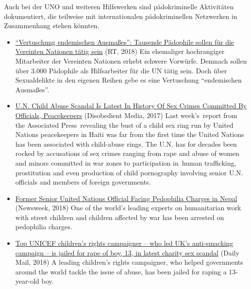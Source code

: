 Auch bei der UNO und weiteren Hilfswerken sind pädokriminelle
Aktivitäten dokumentiert, die teilweise mit internationalen
pädokriminellen Netzwerken in Zusammenhang stehen könnten.

\begin{itemize}
\tightlist
\item
  \href{https://deutsch.rt.com/gesellschaft/65344-vertuschung-endemischen-ausmasses-tausende-paedophile-vereinte-nationen/}{``Vertuschung
  endemischen Ausmaßes'': Tausende Pädophile sollen für die Vereinten
  Nationen tätig sein} (RT, 2018) Ein ehemaliger hochrangiger
  Mitarbeiter der Vereinten Nationen erhebt schwere Vorwürfe. Demnach
  sollen über 3.000 Pädophile als Hilfsarbeiter für die UN tätig sein.
  Doch über Sexualdelikte in den eigenen Reihen gebe es eine Vertuschung
  ``endemischen Ausmaßes''.
\item
  \href{https://web.archive.org/web/20171022041849/https://disobedientmedia.com/2017/04/u-n-child-abuse-scandal-is-latest-in-history-of-sex-crimes-committed-by-officials-peacekeepers/}{U.N.
  Child Abuse Scandal Is Latest In History Of Sex Crimes Committed By
  Officials, Peacekeepers} (Disobedient Media, 2017) Last week's~report
  from the Associated Press~revealing the bust of a child sex ring run
  by United Nations peacekeepers in Haiti was far from the first time
  the United Nations has been associated with child-abuse rings. The
  U.N. has for decades been rocked by accusations of sex crimes ranging
  from rape and abuse of women and minors committed in war zones to
  participation in~human trafficking, prostitution and even production
  of child pornography involving senior U.N. officials and members of
  foreign governments.
\item
  \href{https://www.newsweek.com/former-senior-united-nations-official-facing-pedophilia-charges-nepal-876783}{Former
  Senior United Nations Official Facing Pedophilia Charges in Nepal}
  (Newsweek, 2018) One of the world's leading experts on humanitarian
  work with street children and children affected by war has been
  arrested on pedophilia charges.
\item
  \href{https://www.dailymail.co.uk/news/article-5399247/UNICEF-kids-rights-campaigner-jailed-rape-boy-13.html}{Top
  UNICEF children's rights campaigner -- who led UK's anti-smacking
  campaign -- is jailed for rape of boy, 13, in latest charity sex
  scandal} (Daily Mail, 2018) A leading children's rights campaigner,
  who helped governments around the world tackle the issue of abuse, has
  been jailed for raping a 13-year-old boy.

\end{itemize}
